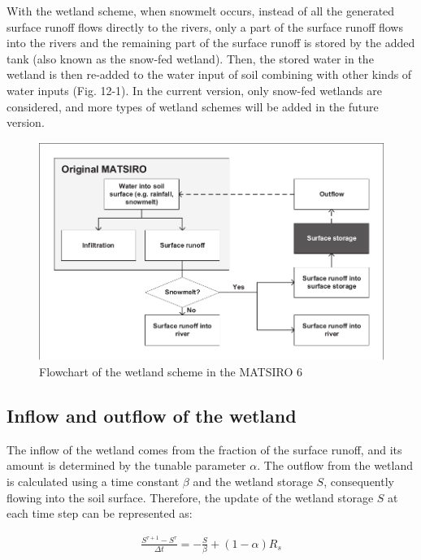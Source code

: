 With the wetland scheme, when snowmelt occurs, instead of all the generated surface runoff flows directly to the rivers, only a part of the surface runoff flows into the rivers and the remaining part
of the surface runoff is stored by the added tank (also known as the snow-fed wetland). Then, the stored water in the wetland is then re-added to the water input of soil combining with other kinds of
water inputs (Fig. 12-1). In the current version, only snow-fed wetlands are considered, and more types of wetland schemes will be added in the future version.

\begin{figure}
\centering
\includegraphics{descript/Wetland_12-1.pdf}
\caption{Flowchart of the wetland scheme in the MATSIRO 6}
\end{figure}

\subsection{Inflow and outflow of the wetland}\label{inflow-and-outflow-of-the-wetland}

The inflow of the wetland comes from the fraction of the surface runoff, and its amount is determined by the tunable parameter \(\alpha\). The outflow from the wetland is calculated using a time
constant \(\beta\) and the wetland storage \(S\), consequently flowing into the soil surface. Therefore, the update of the wetland storage \(S\) at each time step can be represented as:

\begin{eqnarray}
\frac{S^{\tau +1}-S^{\tau }}{\Delta t}=-\frac{S}{\beta}+(1-\alpha )R_{s}
\end{eqnarray}

